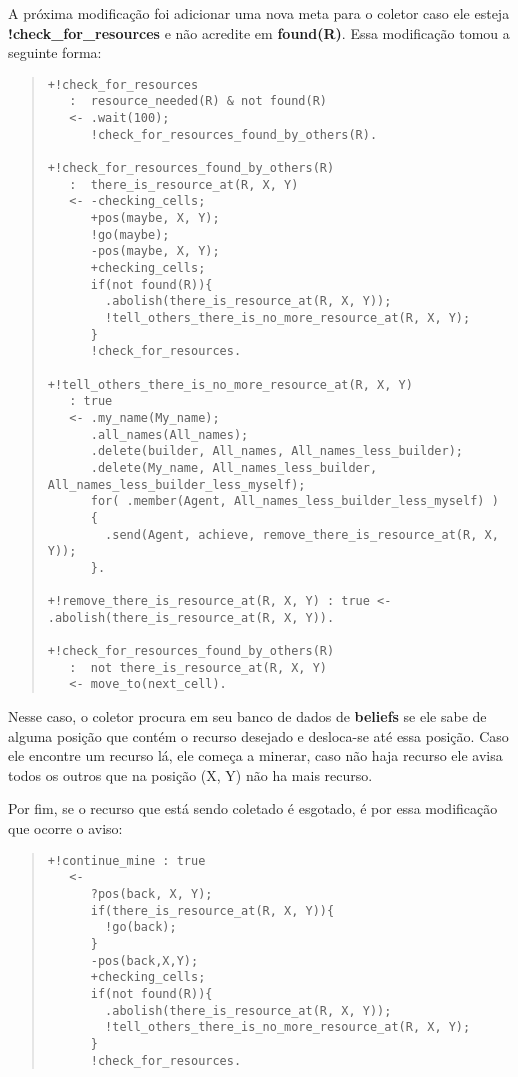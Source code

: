 \documentclass[12pt]{article}
\begin{document}
A próxima modificação foi adicionar uma nova meta para o coletor caso ele esteja \textbf{!check\_for\_resources} e não acredite em \textbf{found(R)}.
Essa modificação tomou a seguinte forma:
\begin{quote}
\begin{verbatim}
+!check_for_resources
   :  resource_needed(R) & not found(R)
   <- .wait(100);
      !check_for_resources_found_by_others(R).

+!check_for_resources_found_by_others(R)
   :  there_is_resource_at(R, X, Y)
   <- -checking_cells;
      +pos(maybe, X, Y);
      !go(maybe);
      -pos(maybe, X, Y);
      +checking_cells;
      if(not found(R)){
        .abolish(there_is_resource_at(R, X, Y));
        !tell_others_there_is_no_more_resource_at(R, X, Y);
      }
      !check_for_resources.

+!tell_others_there_is_no_more_resource_at(R, X, Y)
   : true
   <- .my_name(My_name);
      .all_names(All_names);
      .delete(builder, All_names, All_names_less_builder);
      .delete(My_name, All_names_less_builder, All_names_less_builder_less_myself);
      for( .member(Agent, All_names_less_builder_less_myself) )
      {
        .send(Agent, achieve, remove_there_is_resource_at(R, X, Y));
      }.

+!remove_there_is_resource_at(R, X, Y) : true <- .abolish(there_is_resource_at(R, X, Y)).

+!check_for_resources_found_by_others(R)
   :  not there_is_resource_at(R, X, Y)
   <- move_to(next_cell).
\end{verbatim}
\end{quote}

Nesse caso, o coletor procura em seu banco de dados de \textbf{beliefs} se ele sabe de alguma posição que contém o recurso desejado
e desloca-se até essa posição. Caso ele encontre um recurso lá, ele começa a minerar, caso não haja recurso ele avisa todos os outros
que na posição {(X, Y)} não ha mais recurso.

Por fim, se o recurso que está sendo coletado é esgotado, é por essa modificação que ocorre o aviso:
\begin{quote}
\begin{verbatim}
+!continue_mine : true
   <-
      ?pos(back, X, Y);
      if(there_is_resource_at(R, X, Y)){
        !go(back);
      }
      -pos(back,X,Y);
      +checking_cells;
      if(not found(R)){
        .abolish(there_is_resource_at(R, X, Y));
        !tell_others_there_is_no_more_resource_at(R, X, Y);
      }
      !check_for_resources.

\end{verbatim}
\end{quote}
\end{document}

